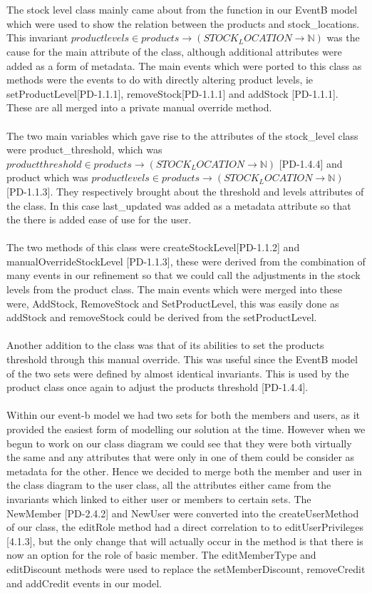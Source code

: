 \documentclass[a4paper]{article}
\begin{document}
\\\\
The stock level class mainly came about from the function in our EventB model which were used to show the relation between the products and stock\_locations. This invariant \(productlevels ∈ products →(STOCK_LOCATION → ℕ) \) was the cause for the main attribute of the class, although additional attributes were added as a form of metadata. The main events which were ported to this class as methods were the events to do with directly altering product levels, ie setProductLevel[PD-1.1.1], removeStock[PD-1.1.1] and addStock [PD-1.1.1]. These are all merged into a private manual override method.
\\\\
The two main variables which gave rise to the attributes of the stock\_level class were product\_threshold, which was \(productthreshold ∈ products → (STOCK_LOCATION → ℕ) \) [PD-1.4.4] and product which was \( productlevels ∈ products →(STOCK_LOCATION → ℕ) \) [PD-1.1.3]. They respectively brought about the threshold and levels attributes of the class. In this case last\_updated was added as a metadata attribute so that the there is added ease of use for the user. 
\\\\
The two methods of this class were createStockLevel[PD-1.1.2] and manualOverrideStockLevel [PD-1.1.3], these were derived from the combination of many events in our refinement so that we could call the adjustments in the stock levels from the product class. The main events which were merged into these were, AddStock, RemoveStock and SetProductLevel, this was easily done as addStock and removeStock could be derived from the setProductLevel. 
\\\\
Another addition to the class was that of its abilities to set the products threshold through this manual override. This was useful since the EventB model of the two sets were defined by almost identical invariants. This is used by the product class once again to adjust the products threshold [PD-1.4.4].
\\\\
Within our event-b model we had two sets for both the members and users, as it provided the easiest form of modelling our solution at the time. However when we begun to work on our class diagram we could see that they were both virtually the same and any attributes that were only in one of them could be consider as metadata for the other. Hence we decided to merge both the member and user in the class diagram to the user class, all the attributes either came from the invariants which linked to either user or members to certain sets. The NewMember [PD-2.4.2] and NewUser were converted into the createUserMethod of our class, the editRole method had a direct correlation to to editUserPrivileges [4.1.3], but the only change that will actually occur in the method is that there is now an option for the role of basic member. The editMemberType and editDiscount methods were used to replace the setMemberDiscount, removeCredit and addCredit events in our model.
\end{document}
